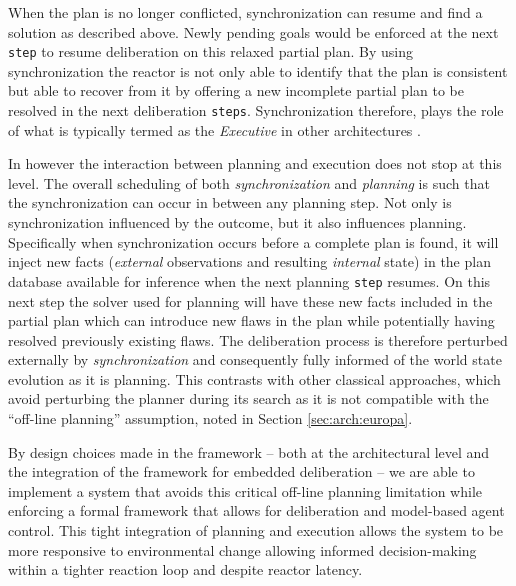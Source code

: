 When the plan is no longer conflicted, synchronization can resume and
find a solution as described above. Newly pending goals would be
enforced at the next \texttt{step} to resume deliberation on this
relaxed partial plan. By using synchronization the reactor is not only
able to identify that the plan is consistent but able to recover from
it by offering a new incomplete partial plan to be resolved in the
next deliberation \texttt{steps}. %
Synchronization therefore, plays the role of what is typically termed
as the {\em Executive} in other architectures \cite{gat98,
  alami:1998p820, mus98, williams03, Nesnas:2003do}.

In \rx however the interaction between planning and execution does not
stop at this level. The overall scheduling of both {\em
  synchronization} and {\em planning} is such that the synchronization
can occur in between any planning step. Not only is synchronization
influenced by the outcome, but it also influences planning.
Specifically when synchronization occurs before a complete plan is
found, it will inject new facts ({\em external} observations and
resulting {\em internal} state) in the plan database available for
inference when the next planning \texttt{step} resumes. On this next
step the \eu solver used for planning will have these new facts
included in the partial plan which can introduce new flaws in the plan
while potentially having resolved previously existing flaws. The
deliberation process is therefore perturbed externally by {\em
  synchronization} and consequently fully informed of the world state
evolution as it is planning. This contrasts with other classical
approaches, which avoid perturbing the planner during its search as it
is not compatible with the ``off-line planning'' assumption, noted in
Section \ref{sec:arch:europa}.

By design choices made in the \rx framework -- both at the
architectural level and the integration of the \eu framework for
embedded deliberation -- we are able to implement a system that avoids
this critical off-line planning limitation while enforcing a formal
framework that allows for deliberation and model-based agent control.
This tight integration of planning and execution allows the system to
be more responsive to environmental change allowing informed
decision-making within a tighter reaction loop and despite reactor
latency.








